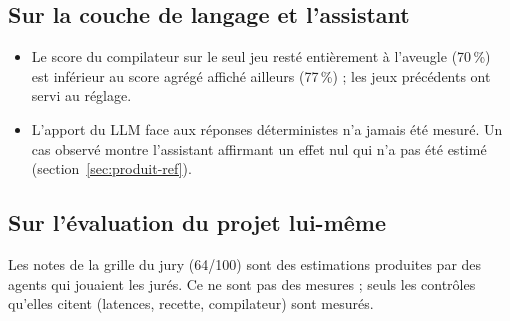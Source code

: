 \subsection{Sur la couche de langage et l'assistant}
\begin{itemize}
\item Le score du compilateur sur le seul jeu resté entièrement à l'aveugle (70\,\%\mesure) est inférieur au score
  agrégé affiché ailleurs (77\,\%) ; les jeux précédents ont servi au réglage.
\item L'apport du LLM face aux réponses déterministes n'a jamais été mesuré. Un cas observé montre l'assistant
  affirmant un effet nul qui n'a pas été estimé (section~\ref{sec:produit-ref}).
\end{itemize}

\subsection{Sur l'évaluation du projet lui-même}
Les notes de la grille du jury (64/100) sont des estimations produites par des agents qui jouaient les jurés. Ce ne
sont pas des mesures ; seuls les contrôles qu'elles citent (latences, recette, compilateur) sont mesurés.
